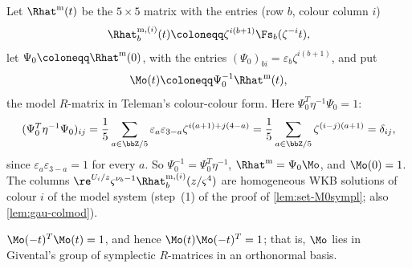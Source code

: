 \begin{defn}
\label{def:set-M0}
Let $\Rhat^{\mathrm m}(t)$ be the $5\times5$ matrix with the entries (row $b$, colour column $i$)
\[
\Rhat^{\mathrm m,(i)}_b(t)\coloneqq\zeta^{i(b+1)}\Fs_b(\zeta^{-i}t),
\]
let $\Psi_0\coloneqq\Rhat^{\mathrm m}(0)$, with the entries $(\Psi_0)_{bi}=\varepsilon_b\zeta^{i(b+1)}$, and put
\[
\Mo(t)\coloneqq\Psi_0^{-1}\Rhat^{\mathrm m}(t),
\]
the model $R$-matrix in Teleman's colour-colour form. Here $\Psi_0^T\eta^{-1}\Psi_0=1$:
\[
(\Psi_0^T\eta^{-1}\Psi_0)_{ij}=\frac15\sum_{a\in\bbZ/5}\varepsilon_a\varepsilon_{3-a}\zeta^{i(a+1)+j(4-a)}=\frac15\sum_{a\in\bbZ/5}\zeta^{(i-j)(a+1)}=\delta_{ij},
\]
since $\varepsilon_a\varepsilon_{3-a}=1$ for every $a$. So $\Psi_0^{-1}=\Psi_0^T\eta^{-1}$, $\Rhat^{\mathrm m}=\Psi_0\Mo$, and $\Mo(0)=1$. The columns $\re^{U_i/z}\varsigma^{\nu_b-1}\Rhat^{\mathrm m,(i)}_b(z/\varsigma^4)$ are homogeneous WKB solutions of colour $i$ of the model system (step~(1) of the proof of \cref{lem:set-M0sympl}; also \cref{lem:gau-colmod}).
\end{defn}

\begin{lem}[Symplecticity of $\Mo$]
\label{lem:set-M0sympl}
$\Mo(-t)^T\Mo(t)=1$, and hence $\Mo(t)\Mo(-t)^T=1$; that is, $\Mo$ lies in Givental's group of symplectic $R$-matrices in an orthonormal basis.
\end{lem}

